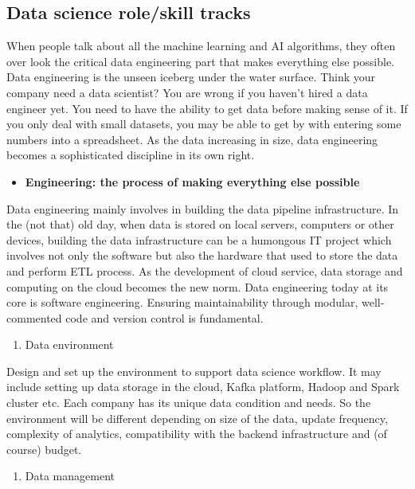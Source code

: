 \documentclass[12pt,]{krantz}
\providecommand{\tightlist}{%
  \setlength{\itemsep}{0pt}\setlength{\parskip}{0pt}}
\theoremstyle{definition}
\theoremstyle{definition}
\theoremstyle{definition}
\theoremstyle{remark}
\begin{document}
\subsection{Data science role/skill
tracks}\label{data-science-roleskill-tracks}

When people talk about all the machine learning and AI algorithms, they
often over look the critical data engineering part that makes everything
else possible. Data engineering is the unseen iceberg under the water
surface. Think your company need a data scientist? You are wrong if you
haven't hired a data engineer yet. You need to have the ability to get
data before making sense of it. If you only deal with small datasets,
you may be able to get by with entering some numbers into a spreadsheet.
As the data increasing in size, data engineering becomes a sophisticated
discipline in its own right.

\begin{itemize}
\tightlist
\item
  \textbf{Engineering: the process of making everything else possible}
\end{itemize}

Data engineering mainly involves in building the data pipeline
infrastructure. In the (not that) old day, when data is stored on local
servers, computers or other devices, building the data infrastructure
can be a humongous IT project which involves not only the software but
also the hardware that used to store the data and perform ETL process.
As the development of cloud service, data storage and computing on the
cloud becomes the new norm. Data engineering today at its core is
software engineering. Ensuring maintainability through modular,
well-commented code and version control is fundamental.

\begin{enumerate}
\def\labelenumi{(\arabic{enumi})}
\tightlist
\item
  Data environment
\end{enumerate}

Design and set up the environment to support data science workflow. It
may include setting up data storage in the cloud, Kafka platform, Hadoop
and Spark cluster etc. Each company has its unique data condition and
needs. So the environment will be different depending on size of the
data, update frequency, complexity of analytics, compatibility with the
backend infrastructure and (of course) budget.

\begin{enumerate}
\def\labelenumi{(\arabic{enumi})}
\setcounter{enumi}{1}
\tightlist
\item
  Data management
\end{enumerate}
\end{document}
